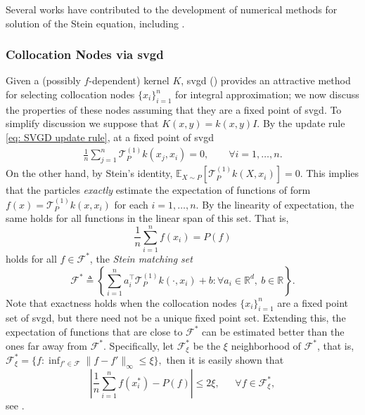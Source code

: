 \documentclass[12pt,paper=letter]{scrreprt}
\def\mbb#1{\mathbb{#1}}
\def\R{\mathbb{R}}
\def\defeq{\triangleq} %
\def\E{\mbb{E}} %
\def\F{\mathcal{F}}
\newcommand{\vv}[1]{#1}
\newcommand{\vx}{x}
\begin{document}
Several works have contributed to the development of numerical methods for solution of the Stein equation, including 
\citet{oates2017control,oates2019convergence,barp2022riemann,si2020scalable,belomestny2020variance,south2022semi,south2022postprocessing,south2023regularized,sun2023vector,leluc2023speeding,belomestny2024theoretical}.




\subsubsection*{Collocation Nodes via \ac{svgd}} 
\label{sec:svgdmoment}

Given a (possibly $f$-dependent) kernel $K$, \ac{svgd} () provides an attractive method for selecting collocation nodes $\{x_i\}_{i=1}^n$ for integral approximation; we now discuss the properties of these nodes assuming that they are a fixed point of \ac{svgd}. 
To simplify discussion we suppose that $K(x,y) = k(x,y) I$.
By the update rule \eqref{eq: SVGD update rule}, at a fixed point of \ac{svgd}
\begin{align}\label{equ:avgk}
\frac{1}{n}\sum_{j=1}^n 
\mathcal T_P^{(1)} k(\vx_j,  x_i) 
= 0, \qquad \forall i = 1, \ldots, n. 
\end{align}
On the other hand, by Stein's identity, $\E_{X \sim P} [\mathcal{T}_P^{(1)} k(X, x_i)] = 0$.
This implies that the particles \emph{exactly} estimate the expectation of functions of form $f(\vx) = \mathcal{T}_P^{(1)} k(\vx,\vx_i)$ for each $i = 1,\dots,n$. 
By the linearity of expectation, the same holds for all functions in the linear span of this set.
That is,
$$
\frac{1}{n} \sum_{i=1}^nf(\vx_i) 
=  P(f)
$$
holds for all $f \in \mathcal F^*$, the \emph{Stein matching set}
$$ 
\mathcal F^* \defeq  
\left \{ \sum_{i = 1}^n  a_i^\top  \mathcal{T}_P^{(1)} k(\cdot,x_i) + b \colon \forall    a_i\in \R^d,   ~ b \in \R \right \} .
$$
Note that exactness holds when the collocation nodes $\{x_i\}_{i=1}^n$ are a fixed point set of \ac{svgd}, but there need not be a unique fixed point set.
Extending this, the expectation of functions that are close to $\F^*$ can be estimated better than the ones far away from $\F^*$. 
Specifically, let $\F^*_{\vv\xi}$ be the $\vv\xi$ neighborhood of $\F^*$, that is, 
$\F_\vv\xi^* = \{f \colon \inf_{f'\in \F} \|f -f'\|_\infty \leq \vv\xi  \},$ 
then it is easily shown that 
$$
\left | \frac{1}{n}\sum_{i=1}^n f(\vx_i^* ) -   P(f) \right |  \leq 2 \vv\xi, ~~~~~~~\forall f \in \mathcal F^*_\vv\xi, 
$$
see \citet{liu2018stein}.
\end{document}
